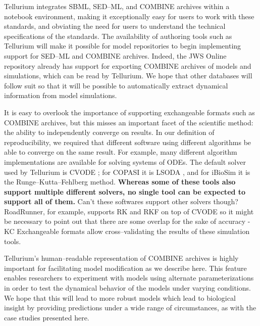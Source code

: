 \documentclass[10pt,letterpaper]{article}
\begin{document}
Tellurium integrates SBML, SED--ML, and COMBINE archives within a notebook environment, making it exceptionally easy for users to work with these standards, and obviating the need for users to understand the technical specifications of the standards. The availability of authoring tools such as Tellurium will make it possible for model repositories to begin implementing support for SED--ML and COMBINE archives. Indeed, the JWS Online repository \cite{olivier2004web} already has support for exporting COMBINE archives of models and simulations, which can be read by Tellurium. We hope that other databases will follow suit so that it will be possible to automatically extract dynamical information from model simulations.

It is easy to overlook the importance of supporting exchangeable formats such as COMBINE archives, but this misses an important facet of the scientific method: the ability to independently converge on results. In our definition of reproducibility, we required that different software using different algorithms be able to converge on the same result. For example, many different algorithm implementations are available for solving systems of ODEs. The default solver used by Tellurium is CVODE \cite{cohen1996cvode}; for COPASI it is LSODA \cite{petzold1989computing}, and for iBioSim it is the Runge–Kutta–Fehlberg method. { \bf Whereas some of these tools also support multiple different solvers, no single tool can be expected to support all of them.} {\color{blue} Can't these softwares support other solvers though? RoadRunner, for example, supports RK and RKF on top of CVODE so it might be necessary to point out that there are some overlap for the sake of accuracy - KC} Exchangeable formats allow cross--validating the results of these simulation tools.


Tellurium's human--readable representation of COMBINE archives is highly important for facilitating model modification as we describe here. This feature enables researchers to experiment with models using alternate parameterizations in order to test the dynamical behavior of the models under varying conditions. We hope that this will lead to more robust models which lead to biological insight by providing predictions under a wide range of circumstances, as with the case studies presented here.
\end{document}

